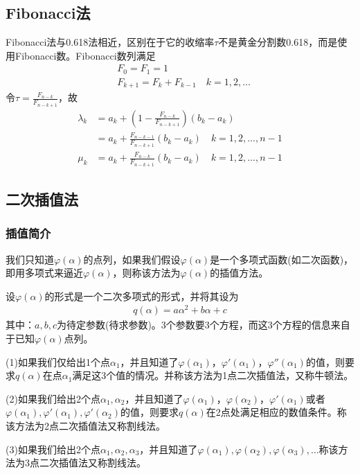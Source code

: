     \subsection{Fibonacci法}
        \par
        Fibonacci法与0.618法相近，区别在于它的收缩率$\tau$不是黄金分割数0.618，而是使用Fibonacci数。Fibonacci数列满足
        \begin{align*}
        &F_0  =F_1=1\\
        &F_{k+1}  =F_k+F_{k-1}\quad k=1,2,\dots
        \end{align*}
        令$\tau=\frac{F_{n-k}}{F_{n-k+1}}$，故
        \begin{align*}
        {\lambda}_k&=a_k+\left( 1-\frac{F_{n-k}}{F_{n-k+1}} \right) ({b}_k-a_k)\\
        &=a_k+\frac{F_{n-k-1}}{F_{n-k+1}}(b_k-a_k)\quad k=1,2,\ldots,n-1 \\
        {\mu}_k& =a_k+\frac{F_{n-k}}{F_{n-k+1}}(b_k-a_k) \quad k=1,2,\ldots,n-1
        \end{align*}
    \subsection{二次插值法}
        \subsubsection{插值简介}
            \par
            我们只知道$\varphi(\alpha)$的点列，如果我们假设$\varphi(\alpha)$是一个多项式函数(如二次函数)，即用多项式来逼近$\varphi(\alpha)$，则称该方法为$\varphi(\alpha)$的插值方法。
            \par
            设$\varphi(\alpha)$的形式是一个二次多项式的形式，并将其设为
            \begin{align*}
            q(\alpha)=a{\alpha}^2+b{\alpha}+c
            \end{align*}
            其中：$a,b,c$为待定参数(待求参数)。3个参数要3个方程，而这3个方程的信息来自于已知$\varphi(\alpha)$点列。
            \par
            (1)如果我们仅给出1个点${\alpha}_1$，并且知道了$\varphi({\alpha}_1)$，${\varphi}'({\alpha}_1)$，${\varphi}''({\alpha}_1)$的值，则要求$q(\alpha)$在点${\alpha}_1$满足这3个值的情况。并称该方法为1点二次插值法，又称牛顿法。
            \par
            (2)如果我们给出2个点${\alpha}_1,{\alpha}_2$，并且知道了$\varphi({\alpha}_1)$，$\varphi({\alpha}_2)$，${\varphi}'({\alpha}_1)$或者$\varphi({\alpha}_1),{\varphi}'({\alpha}_1),{\varphi}'({\alpha}_2)$的值，则要求$q(\alpha)$在2点处满足相应的数值条件。称该方法为2点二次插值法又称割线法。
            \par
            (3)如果我们给出2个点${\alpha}_1,{\alpha}_2,{\alpha}_3$，并且知道了$\varphi({\alpha}_1),\varphi({\alpha}_2),\varphi({\alpha}_3),\ldots$称该方法为3点二次插值法又称割线法。

